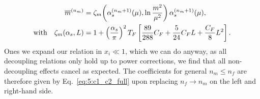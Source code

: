 \begin{equation}
\begin{split}
\overline{m}^{(n_m)} &= \zeta_m\!\left(\alpha_s^{(n_m + 1)}(\mu) , \ln \frac{m^2}{\mu^2} \right) \alpha_s^{(n_m + 1)}(\mu), \\
\text{with} \quad \zeta_m (\alpha_s, L) &=  1 + \left(\frac{\alpha_s}{\pi}\right)^2 T_F \left[ \frac{89}{288} C_F  + \frac{5}{24} C_F L + \frac{C_F}{8} L^2 \right].
\end{split}
\end{equation}
Ones we expand our relation in $x_i \ll 1$, which we can do anyway, as all decoupling relations only hold up to power corrections, we find that all non-decoupling effects cancel as expected. The coefficients for general $n_m \le n_f$ are therefore given by Eq.~\eqref{eq:5:c1_c2_full} upon replacing $n_f \rightarrow n_m$ on the left and right-hand side.

